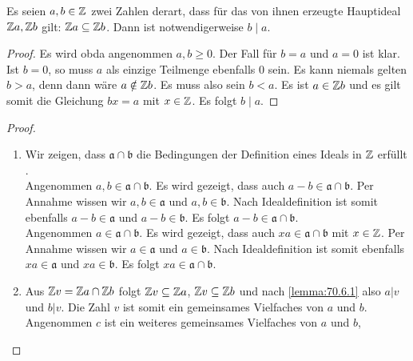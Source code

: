 \begin{lemma}
  \label{lemma:70.6.1}
  Es seien $a,b \in \mathbb{Z}$ zwei Zahlen derart, dass für das von ihnen
  erzeugte Hauptideal $\mathbb{Z}{}a, \mathbb{Z}{}b$ gilt:
  $\mathbb{Z}{}a \subseteq \mathbb{Z}{}b$.
  Dann ist notwendigerweise $b \mid a$.
\end{lemma}
\begin{proof}
  Es wird \ac{obda} angenommen $a,b \geq 0$.
  Der Fall für $b = a$ und $a = 0$ ist klar. Ist $b = 0$, so muss $a$
  als einzige Teilmenge ebenfalls $0$ sein. Es kann niemals gelten $b > a$, denn
  dann wäre $a \notin \mathbb{Z}{}b$. Es muss also sein $b < a$.
  Es ist $a \in \mathbb{Z}{}b$ und
  es gilt somit die Gleichung $bx = a$ mit $x \in \mathbb{Z}$.
  Es folgt $b \mid a$.
\end{proof}
\begin{proof}
  \begin{enumerate}[label=\alph*)]
    \item Wir zeigen, dass $\mathfrak{a} \cap \mathfrak{b}$ die Bedingungen
          der Definition eines Ideals in $\mathbb{Z}$ erfüllt
          \parencite[60]{book:zahlentheorie}.\\
           Angenommen $a,b \in \mathfrak{a} \cap \mathfrak{b}$.
          Es wird gezeigt, dass auch $a - b \in \mathfrak{a} \cap \mathfrak{b}$.
          Per Annahme wissen wir $a,b \in \mathfrak{a}$ und $a,b \in \mathfrak{b}$.
          Nach Idealdefinition ist somit ebenfalls
          $a - b \in \mathfrak{a}$ und $a - b \in \mathfrak{b}$.
          Es folgt $a - b \in \mathfrak{a} \cap \mathfrak{b}$.\\
           Angenommen $a \in \mathfrak{a} \cap \mathfrak{b}$.
          Es wird gezeigt, dass auch $xa \in \mathfrak{a} \cap \mathfrak{b}$
          mit $x \in \mathbb{Z}$. Per Annahme wissen wir
          $a \in \mathfrak{a}$ und $a \in \mathfrak{b}$.
          Nach Idealdefinition ist somit ebenfalls
          $xa \in \mathfrak{a}$ und $xa \in \mathfrak{b}$.
          Es folgt $xa \in \mathfrak{a} \cap \mathfrak{b}$.
    \item Aus $\mathbb{Z}{}v = \mathbb{Z}{}a \cap \mathbb{Z}{}b$
          folgt $\mathbb{Z}{}v \subseteq \mathbb{Z}{}a$,
          $\mathbb{Z}{}v \subseteq \mathbb{Z}{}b$ und nach \autoref{lemma:70.6.1}
          also $a | v$ und $b | v$. Die Zahl $v$ ist somit
          ein gemeinsames Vielfaches von $a$ und $b$.
          Angenommen $c$ ist ein weiteres gemeinsames Vielfaches von $a$ und $b$,

\end{enumerate}
\end{proof}
